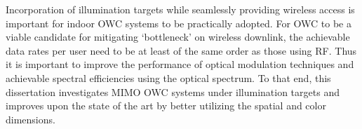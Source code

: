 Incorporation of illumination targets while seamlessly providing wireless access is important for indoor OWC systems to be practically adopted. For OWC to be a viable candidate for mitigating `bottleneck' on wireless downlink, the achievable data rates per user need to be at least of the same order as those using RF. Thus it is important to improve the performance of optical modulation techniques and achievable spectral efficiencies using the optical spectrum. To that end, this dissertation investigates MIMO OWC systems under illumination targets and improves upon the state of the art by better utilizing the spatial and color dimensions. 


